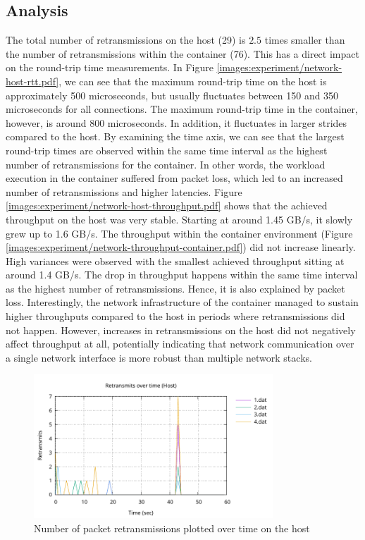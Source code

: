 \subsection{Analysis}
The total number of retransmissions on the host (29) is $2.5$ times smaller than 
the number of retransmissions within the container (76). This has a direct impact on 
the round-trip time measurements. In Figure  \ref{images:experiment/network-host-rtt.pdf}, we 
can see that the maximum round-trip time on the host is approximately 500 microseconds, but usually 
fluctuates between 150 and 350 microseconds for all connections. The maximum round-trip time 
in the container, however, is around 800 microseconds. In addition, 
it fluctuates in larger strides compared to the host. By examining the time axis, we can see 
that the largest round-trip times are observed within the same time interval as the 
highest number of retransmissions for the container. In other words, the workload execution 
in the container suffered from packet loss, which led to an increased number of retransmissions
and higher latencies. Figure \ref{images:experiment/network-host-throughput.pdf} shows 
that the achieved throughput on the host was very stable. Starting at around 1.45 GB/s, 
it slowly grew up to 1.6 GB/s. The throughput within the container environment (Figure \ref{images:experiment/network-throughput-container.pdf})
did not increase linearly. High variances were observed with the smallest achieved throughput 
sitting at around 1.4 GB/s. The drop in throughput happens within the same time interval 
as the highest number of retransmissions. Hence, it is also explained by packet loss.
Interestingly, the network infrastructure of the container managed to sustain higher 
throughputs compared to the host in periods where retransmissions did not happen.
However, increases in retransmissions on the host did not negatively affect throughput at all,
potentially indicating that network communication over a single network interface is more robust 
than multiple network stacks.

\begin{figure}[H]
    \centering
    \includegraphics[width=0.8\textwidth]{images/results/network-host-retransmits.pdf}
    \caption{Number of packet retransmissions plotted over time on the host}
    \label{images:experiment/network-host-retransmits.pdf}
\end{figure}

